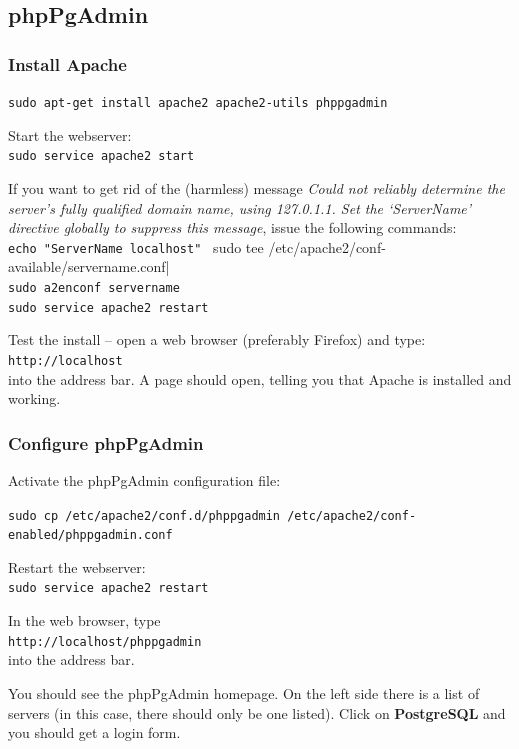 \documentclass[a4paper,10pt, oneside]{book}
\begin{document}
\subsection{phpPgAdmin}

\subsubsection{Install Apache}
\label{ss:apache}

\verb|sudo apt-get install apache2 apache2-utils phppgadmin|

Start the webserver:\\
\verb|sudo service apache2 start|

If you want to get rid of the (harmless) message \textit{Could not reliably determine the server's fully qualified domain name, using 127.0.1.1. Set the `ServerName' directive globally to suppress this message}, issue the following commands:\\
\verb|echo "ServerName localhost" | sudo tee /etc/apache2/conf-available/servername.conf|\\
\verb|sudo a2enconf servername|\\
\verb|sudo service apache2 restart|

Test the install -- open a web browser (preferably Firefox) and type:\\
\verb|http://localhost|\\
into the address bar. A page should open, telling you that Apache is installed and working.

\subsubsection{Configure phpPgAdmin}

Activate the phpPgAdmin configuration file:

\verb|sudo cp /etc/apache2/conf.d/phppgadmin /etc/apache2/conf-enabled/phppgadmin.conf|

Restart the webserver:\\
\verb|sudo service apache2 restart|

In the web browser, type\\
\verb|http://localhost/phppgadmin|\\
into the address bar.

You should see the phpPgAdmin homepage. On the left side there is a list of servers (in this case, there should only be one listed). Click on \textbf{PostgreSQL} and you should get a login form.
\end{document}
